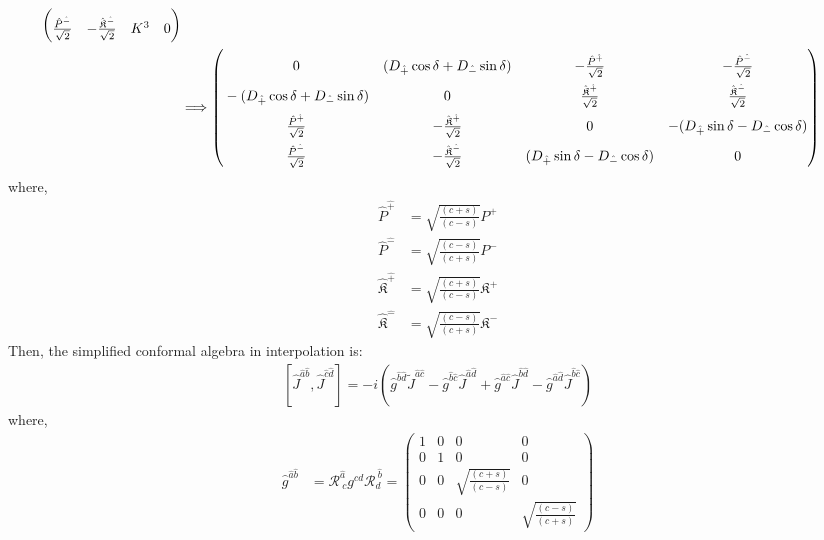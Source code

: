 \documentclass[]{article}
\numberwithin{equation}{section}
\begin{document}
{{\begin{align}
\begin{pmatrix}
    \rule{0pt}{16pt} \frac{\hat{P}^{\hat{-}}}{\sqrt{2}}&-\frac{\hat{\mathfrak{K}}^{\hat{-}}}{\sqrt{2}}&K^3  & 0
  \end{pmatrix} \\
  &\Longrightarrow \begin{pmatrix}
    \rule{0pt}{16pt} 0&(D_{\hat{+}}\cos{\delta}+D_{\hat{-}}\sin{\delta})&-\frac{\hat{P}^{\hat{+}}}{\sqrt{2}}&-\frac{\hat{P}^{\hat{-}}}{\sqrt{2}}\\
    \rule{0pt}{16pt} -(D_{\hat{+}}\cos{\delta}+D_{\hat{-}}\sin{\delta})&0&\frac{\hat{\mathfrak{K}}^{\hat{+}}}{\sqrt{2}}&\frac{\hat{\mathfrak{K}}^{\hat{-}}}{\sqrt{2}}\\
    \rule{0pt}{16pt} \frac{\hat{P}^{\hat{+}}}{\sqrt{2}}&-\frac{\hat{\mathfrak{K}}^{\hat{+}}}{\sqrt{2}}&0  & -(D_{\hat{+}}\sin{\delta}-D_{\hat{-}}\cos{\delta})\\
    \rule{0pt}{16pt} \frac{\hat{P}^{\hat{-}}}{\sqrt{2}}&-\frac{\hat{\mathfrak{K}}^{\hat{-}}}{\sqrt{2}}&(D_{\hat{+}}\sin{\delta}-D_{\hat{-}}\cos{\delta})  & 0
  \end{pmatrix}
\end{align}
where,
\begin{align}
    \hat{P}^{\hat{+}}&=\sqrt{\frac{(c+s)}{(c-s)}}P^{{+}}\\
    \hat{P}^{\hat{-}}&=\sqrt{\frac{(c-s)}{(c+s)}}P^{{-}}\\
    \hat{\mathfrak{K}}^{\hat{+}}&=\sqrt{\frac{(c+s)}{(c-s)}}\mathfrak{K}^{{+}}\\
    \hat{\mathfrak{K}}^{\hat{-}}&=\sqrt{\frac{(c-s)}{(c+s)}}\mathfrak{K}^{{-}}
\end{align}
Then, the simplified conformal algebra in interpolation is:
  \begin{align}
      \left[\hat{J}^{{\hat{a}}{\hat{b}}},\hat{J}^{{\hat{c}}{\hat{d}}}\right]=-i\left(\hat{g}^{{\hat{b}}{\hat{d}}}\tilde{J}^{{\hat{a}}{\hat{c}}}-\hat{g}^{{\hat{b}}{\hat{c}}}\hat{J}^{{\hat{a}}{\hat{d}}}+\hat{g}^{{\hat{a}}{\hat{c}}}\hat{J}^{{\hat{b}}{\hat{d}}}-\hat{g}^{{\hat{a}}{\hat{d}}}\hat{J}^{{\hat{b}}{\hat{c}}}\right)\label{simplesrint}
  \end{align}
where, 
\begin{align}
\hat{g}^{\hat{a}\hat{b}}&=\mathcal{R}^{\hat{a}}_{{~c}}g^{cd}\mathcal{R}^{~\hat{b}}_{{d}}=\begin{pmatrix}
     1&0&0&0\\
     0&1&0&0\\
     0&0&\sqrt{\frac{(c+s)}{(c-s)}}  & 0\\
     0&0&0 & \sqrt{\frac{(c-s)}{(c+s)}} 

\end{pmatrix}
\end{align}}}
\end{document}
